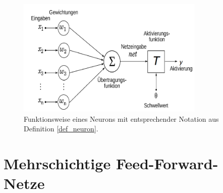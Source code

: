 \begin{figure}[h]
    \label{funktionsweise_neuron}
    \includegraphics[width=0.8\textwidth]{pics/chapter_neuralnetworks/NeuronModel_wiki_n.png}
    \centering
    \caption{Funktionsweise eines Neurons mit entsprechender Notation aus Definition \ref{def_neuron}.}
\end{figure}

\section{Mehrschichtige Feed-Forward-Netze}